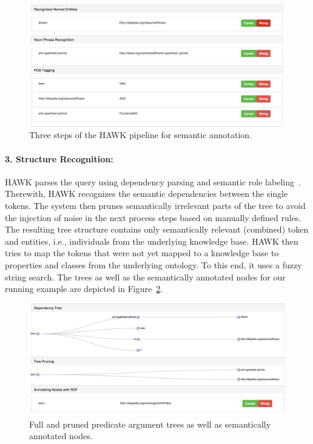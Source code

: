 \documentclass{llncs}
\begin{document}
\begin{figure}[htb!]
\centering
\includegraphics[width=\linewidth]{2_semantic_annotation}
\caption{Three steps of the HAWK pipeline for semantic annotation.}
\label{fig:2_semantic_annotation}
\end{figure}

\paragraph{\textbf{3. Structure Recognition}:}
HAWK parses the query using dependency parsing and semantic role labeling~\cite{choi2011getting}.
Therewith, HAWK recognizes the semantic dependencies between the single tokens.
The system then prunes semantically irrelevant parts of the tree to avoid the injection of noise in the next process steps based on manually defined rules.
The resulting tree structure contains only semantically relevant (combined) token and entities, i.e., individuals from the underlying knowledge base. 
HAWK then tries to map the tokens that were not yet mapped to a knowledge base to properties and classes from the underlying ontology. To this end, it uses  a fuzzy string search.
The trees as well as the semantically annotated nodes for our running example are depicted in Figure~\ref{fig:3_structure_recognition}.
\begin{figure}[htb!]
\centering
\includegraphics[width=\linewidth]{3_structure_recognition}
\caption{Full and pruned predicate argument trees as well as semantically annotated nodes.}
\label{fig:3_structure_recognition}
\end{figure}
\end{document}
